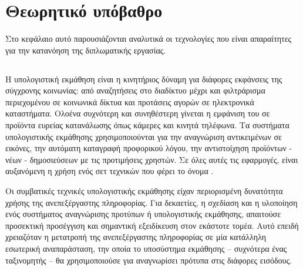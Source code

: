 \chapter{Θεωρητικό υπόβαθρο}

Στο κεφάλαιο αυτό παρουσιάζονται αναλυτικά οι τεχνολογίες που είναι απαραίτητες για την κατανόηση της διπλωματικής εργασίας.

\section{\cite{LeCun2015}}

Η υπολογιστική εκμάθηση  είναι η κινητήριος δύναμη για διάφορες εκφάνσεις της σύγχρονης κοινωνίας: από αναζητήσεις στο διαδίκτυο μέχρι και φιλτράρισμα περιεχομένου σε κοινωνικά δίκτυα και προτάσεις αγορών σε ηλεκτρονικά καταστήματα. 
Ολοένα συχνότερη και συνηθέστερη γίνεται η εμφάνιση του σε προϊόντα ευρείας κατανάλωσης όπως κάμερες και κινητά τηλέφωνα. 
Τα συστήματα υπολογιστικής εκμάθησης χρησιμοποιούνται για την αναγνώριση αντικειμένων σε εικόνες, την αυτόματη καταγραφή προφορικού λόγου, την αντιστοίχηση προϊόντων - νέων - δημοσιεύσεων με τις προτιμήσεις χρηστών. 
Σε όλες αυτές τις εφαρμογές, είναι αυξανόμενη η χρήση ενός σετ τεχνικών που φέρει το όνομα .

Οι συμβατικές τεχνικές υπολογιστικής εκμάθησης είχαν περιορισμένη δυνατότητα χρήσης της ανεπεξέργαστης πληροφορίας. 
Για δεκαετίες, η σχεδίαση και η υλοποίηση ενός συστήματος αναγνώρισης προτύπων ή υπολογιστικής εκμάθησης, απαιτούσε προσεκτική προσέγγιση και σημαντική εξειδίκευση στον εκάστοτε τομέα. 
Αυτό επειδή χρειαζόταν η μετατροπή της ανεπεξέργαστης πληροφορίας σε μία κατάλληλη εσωτερική αναπαράσταση, την οποία το υποσύστημα εκμάθησης -- συχνότερα ένας ταξινομητής -- θα χρησιμοποιούσε για αναγνωρίσει πρότυπα στις διάφορες εισόδους.

